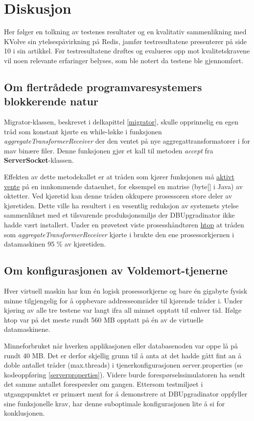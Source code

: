 \section{Diskusjon}

Her følger en tolkning av testenes resultater og en kvalitativ sammenlikning med KVolve sin ytelsespåvirkning på Redis, jamfør testresultatene \cite{saur2016} presenterer på side 10 i sin artikkel. Før testresultatene drøftes og evalueres opp mot kvalitetskravene vil noen relevante erfaringer belyses, som ble notert da testene ble gjennomført.

\subsection{Om flertrådede programvaresystemers blokkerende natur}

Migrator-klassen, beskrevet i delkapittel \ref{migrator}, skulle opprinnelig en egen tråd som konstant kjørte en while-løkke i funksjonen \emph{aggregateTransformerReceiver} der den ventet på nye aggregattransformatorer i for mav binære filer. Denne funksjonen gjør et kall til metoden \emph{accept} fra \textbf{ServerSocket}-klassen.

Effekten av dette metodekallet er at tråden som kjører funksjonen må \underline{aktivt vente} på en innkommende dataenhet, for eksempel en matrise (byte[] i Java) av oktetter. Ved kjøretid kan denne tråden okkupere prosessoren store deler av kjøretiden. Dette ville ha resultert i en vesentlig reduksjon av systemets ytelse sammenliknet med et tilsvarende produksjonsmiljø der DBUpgradinator ikke hadde vært installert. Under en prøvetest viste prosesshåndtøren \underline{htop} at tråden som \emph{aggregateTransformerReceiver} kjørte i brukte den ene prosessorkjernen i datamaskinen 95 \% av kjøretiden.

\subsection{Om konfigurasjonen av Voldemort-tjenerne}

Hver virtuell maskin har kun én logisk prosessorkjerne og bare én gigabyte fysisk minne tilgjengelig for å oppbevare addresseområder til kjørende tråder i. Under kjøring av alle tre testene var langt ifra all minnet opptatt til enhver tid. Ifølge htop var på det meste rundt 560 MB opptatt på én av de virtuelle datamaskinene.

Minneforbruket når hverken applikasjonen eller databasenoden var oppe lå på rundt 40 MB. Det er derfor skjellig grunn til å anta at det hadde gått fint an å doble antallet tråder (max.threads) i tjenerkonfigurasjonen server.properties (se kodeoppføring \ref{serverproperties}). Videre burde forespørselssimulatoren ha sendt det samme antallet forespørsler om gangen. Ettersom testmiljøet i utgangspunktet er primært ment for å demonstrere at DBUpgradinator oppfyller sine funksjonelle krav, har denne suboptimale konfigurasjonen lite å si for konklusjonen.

